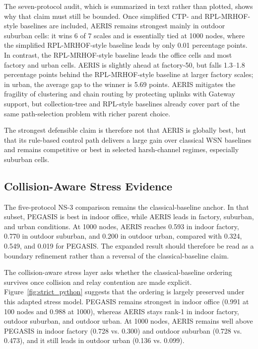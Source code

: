\documentclass[conference]{IEEEtran}
\begin{document}
The seven-protocol audit, which is summarized in text rather than plotted, shows why that claim must still be bounded. Once simplified CTP- and RPL-MRHOF-style baselines are included, AERIS remains strongest mainly in outdoor suburban cells: it wins 6 of 7 scales and is essentially tied at 1000 nodes, where the simplified RPL-MRHOF-style baseline leads by only 0.01 percentage points. In contrast, the RPL-MRHOF-style baseline leads the office cells and most factory and urban cells. AERIS is slightly ahead at factory-50, but falls 1.3--1.8 percentage points behind the RPL-MRHOF-style baseline at larger factory scales; in urban, the average gap to the winner is 5.69 points. AERIS mitigates the fragility of clustering and chain routing by protecting uplinks with Gateway support, but collection-tree and RPL-style baselines already cover part of the same path-selection problem with richer parent choice.

The strongest defensible claim is therefore not that AERIS is globally best, but that its rule-based control path delivers a large gain over classical WSN baselines and remains competitive or best in selected harsh-channel regimes, especially suburban cells.

\subsection{Collision-Aware Stress Evidence}
The five-protocol NS-3 comparison remains the classical-baseline anchor. In that subset, PEGASIS is best in indoor office, while AERIS leads in factory, suburban, and urban conditions. At 1000 nodes, AERIS reaches 0.593 in indoor factory, 0.770 in outdoor suburban, and 0.200 in outdoor urban, compared with 0.324, 0.549, and 0.019 for PEGASIS. The expanded result should therefore be read as a boundary refinement rather than a reversal of the classical-baseline claim.

The collision-aware stress layer asks whether the classical-baseline ordering survives once collision and relay contention are made explicit. Figure~\ref{fig:strict_python} suggests that the ordering is largely preserved under this adapted stress model. PEGASIS remains strongest in indoor office (0.991 at 100 nodes and 0.988 at 1000), whereas AERIS stays rank-1 in indoor factory, outdoor suburban, and outdoor urban. At 1000 nodes, AERIS remains well above PEGASIS in indoor factory (0.728 vs. 0.300) and outdoor suburban (0.728 vs. 0.473), and it still leads in outdoor urban (0.136 vs. 0.099).
\end{document}
